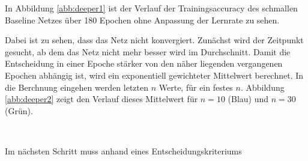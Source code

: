 In Abbildung \ref{abb:deeper1} ist der Verlauf der Trainingsaccuracy des schmallen Baseline Netzes über 180 Epochen ohne Anpassung der Lernrate zu sehen. 



Dabei ist zu sehen, dass das Netz nicht konvergiert. Zunächst wird der Zeitpunkt gesucht, ab dem das Netz nicht mehr besser wird im Durchschnitt. Damit die Entscheidung in einer Epoche stärker von den näher liegenden vergangenen Epochen abhängig ist, wird ein exponentiell gewichteter Mittelwert berechnet. In die Berchnung eingehen werden letzten $n$ Werte, für ein festes $n$.
Abbildung \ref{abb:deeper2} zeigt den Verlauf dieses Mittelwert für $n=10$ (Blau) und $n=30$ (Grün).
\begin{figure}
     \centering
     \hfill
     \\
     \caption{}
     \label{abb:memory}
\end{figure}
Im nächsten Schritt muss anhand eines Entscheidungskriteriums 


\color{black}
